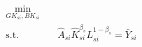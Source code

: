 \begin{equation*}
    \begin{split}
        \min_{GK_{si}, BK_{si}} & \quad
         \\
        \text{s.t.} & \quad \hat{A}_{si}\hat{K}_{si}^{\beta_s} L_{si}^{1-\beta_s} = \bar{Y}_{si}\\
    \end{split}
\end{equation*}